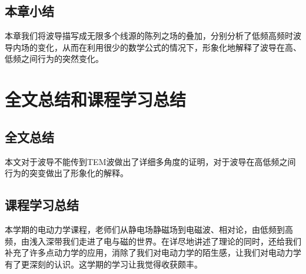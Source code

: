 \documentclass[bachelor]{thesis-uestc}
\begin{document}
\section{本章小结}

本章我们将波导描写成无限多个线源的陈列之场的叠加，分别分析了低频高频时波导内场的变化，从而在利用很少的数学公式的情况下，形象化地解释了波导在高、低频之间行为的突然变化。


\chapter{全文总结和课程学习总结}

\section{全文总结}
本文对于波导不能传到TEM波做出了详细多角度的证明，对于波导在高低频之间行为的突变做出了形象化的解释。

\section{课程学习总结}
本学期的电动力学课程，老师们从静电场静磁场到电磁波、相对论，由低频到高频，由浅入深带我们走进了电与磁的世界。在详尽地讲述了理论的同时，还给我们补充了许多点动力学的应用，消除了我们对电动力学的陌生感，让我们对电动力学有了更深刻的认识。这学期的学习让我觉得收获颇丰。


\end{document}
